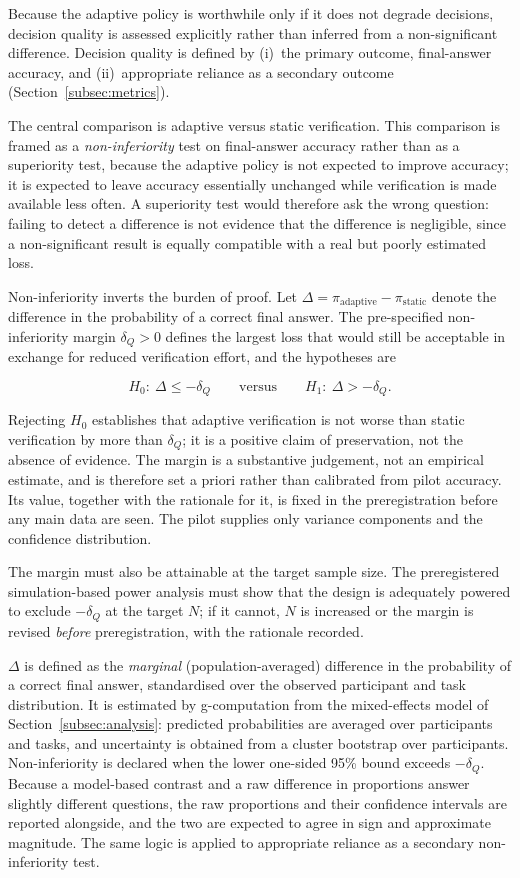 \documentclass[oneside,final,14pt,a4paper]{extreport}
\begin{document}
Because the adaptive policy is worthwhile only if it does not degrade
decisions, decision quality is assessed explicitly rather than inferred from a
non-significant difference. Decision quality is defined by (i)~the primary
outcome, final-answer accuracy, and (ii)~appropriate reliance as a secondary
outcome (Section~\ref{subsec:metrics}).

The central comparison is adaptive versus static verification. This comparison
is framed as a \emph{non-inferiority} test on final-answer accuracy rather than
as a superiority test, because the adaptive policy is not expected to improve
accuracy; it is expected to leave accuracy essentially unchanged while
verification is made available less often. A superiority test would therefore
ask the wrong question: failing to detect a difference is not evidence that the
difference is negligible, since a non-significant result is equally compatible
with a real but poorly estimated loss.

Non-inferiority inverts the burden of proof. Let
$\Delta = \pi_{\mathrm{adaptive}} - \pi_{\mathrm{static}}$ denote the difference
in the probability of a correct final answer. The pre-specified
non-inferiority margin $\delta_Q > 0$ defines the largest loss that would still
be acceptable in exchange for reduced verification effort, and the hypotheses
are

$$
H_0:\ \Delta \le -\delta_Q
\qquad\text{versus}\qquad
H_1:\ \Delta > -\delta_Q .
$$

Rejecting $H_0$ establishes that adaptive verification is not worse than static
verification by more than $\delta_Q$; it is a positive claim of preservation,
not the absence of evidence. The margin is a substantive judgement, not an
empirical estimate, and is therefore set a priori rather than calibrated from
pilot accuracy. Its value, together with the rationale for it, is fixed in the
preregistration before any main data are seen. The pilot supplies only variance
components and the confidence distribution.

The margin must also be attainable at the target sample size. The preregistered
simulation-based power analysis must show that the design is adequately powered
to exclude $-\delta_Q$ at the target $N$; if it cannot, $N$ is
increased or the margin is revised \emph{before} preregistration, with the
rationale recorded.

$\Delta$ is defined as the \emph{marginal} (population-averaged) difference in
the probability of a correct final answer, standardised over the observed
participant and task distribution. It is estimated by g-computation from the
mixed-effects model of Section~\ref{subsec:analysis}: predicted probabilities
are averaged over participants and tasks, and uncertainty is obtained from a
cluster bootstrap over participants. Non-inferiority is declared when the lower
one-sided 95\% bound exceeds $-\delta_Q$. Because a model-based contrast and a
raw difference in proportions answer slightly different questions, the raw
proportions and their confidence intervals are reported alongside, and the two
are expected to agree in sign and approximate magnitude. The same logic is
applied to appropriate reliance as a secondary non-inferiority test.
\end{document}
